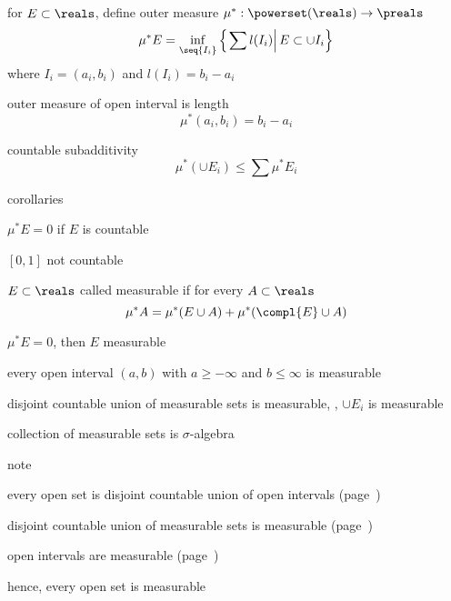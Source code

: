\documentclass[17pt,landscape]{foils}
\begin{document}
{{%

\bit
	\item for $E\subset\reals$, define outer measure $\mu^\ast:\powerset(\reals)\to\preals$
	\[
		\mu^\ast E = \inf_{\seq{I_i}} \left\{\left.\sum l(I_i) \right| E\subset \cup I_i\right\}
	\]
	where $I_i=(a_i,b_i)$ and $l(I_i) = b_i-a_i$

	\vitem outer measure of open interval is length
	\[
		\mu^\ast(a_i,b_i) = b_i-a_i
	\]

	\vitem countable subadditivity
	\[
		\mu^\ast\left(\cup E_i\right) \leq \sum \mu^\ast E_i
	\]

	\vitem corollaries
	\bit
		\item $\mu^\ast E = 0$ if $E$ is countable
		\item $[0,1]$ not countable
	\eit
\eit


%

\bit
	\item $E\subset\reals$ called measurable if for every $A\subset\reals$
	\[
		\mu^\ast A = \mu^\ast (E\cup A) + \mu^\ast (\compl{E}\cup {A})
	\]

	\vitem $\mu^\ast E =0$, then $E$ measurable

	\vitem every open interval $(a,b)$ with $a\geq -\infty$ and $b\leq \infty$ is measurable

	\vitem disjoint countable union of measurable sets is measurable, \ie, $\cup E_i$ is measurable

	\vitem collection of measurable sets is $\sigma$-algebra%
\eit



\bit
	\item note
	\bit
		\item every open set is disjoint countable union of open intervals (page~\pageref{page:open-closed-fact})
		\item disjoint countable union of measurable sets is measurable (page~\pageref{page:measurable-sets})
		\item open intervals are measurable (page~\pageref{page:measurable-sets})
	\eit

	\vitem hence, every open set is measurable

}}
\end{document}
